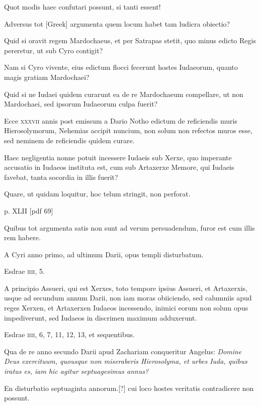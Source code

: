 \begin{parnumbers}
Quot modis haec confutari possunt, si tanti essent!

Adversus tot \textgreek{[Greek]} argumenta quem locum
 habet tam ludicra obiectio?

Quid si oravit regem Mardochaeus, et per Satrapas stetit, quo
minus edicto Regis pereretur, ut sub Cyro contigit?

Nam si Cyro vivente,
eius edictum flocci fecerunt hostes Iudaeorum, quanto magis
gratiam Mardochaei?

Quid si ne Iudaei quidem curarunt ea de re Mardochaeum
compellare, ut non Mardochaei, sed ipsorum Iudaeorum
culpa fuerit?

Ecce \textsc{xxxvii} annis post emissum a Dario Notho edictum
de reficiendis muris Hierosolymorum, Nehemias accipit nuncium,
non solum non refectos muros esse, sed neminem de reficiendis
quidem curare.

Haec negligentia nonne potuit incessere Iudaeis sub
Xerxe, quo imperante accusatio in Iudaeos instituta est, cum sub Artaxerxe
Memore, qui Iudaeis favebat, tanta socordia in illis fuerit?

Quare, ut quidam loquitur, hoc telum stringit, non perforat.

\clearpage
p. XLII [pdf 69]

Quibus tot argumenta satis non sunt ad verum persuadendum, furor est
cum illis rem habere.

A Cyri anno primo, ad ultimum Darii, opus
templi disturbatum.

Esdrae \textsc{iiii}, 5.

A principio Assueri, qui est
Xerxes, toto tempore ipsius Assueri, et Artaxerxis, usque ad secundum
annum Darii, non iam moras obiiciendo, sed calumniis apud
reges Xerxen, et Artaxerxen Iudaeos incessendo, inimici eorum
non solum opus impediverunt, sed Iudaeos in discrimen maximum
adduxerunt.

Esdrae \textsc{iiii}, 6, 7, 11, 12, 13, et sequentibus.

Qua de re
anno secundo Darii apud Zachariam conqueritur Angelus: \textit{Domine
Deus exercituum, quousque non miseraberis Hierosolyma, et
urbes Iuda, quibus iratus es, iam hic agitur septuagesimus annus?}

En disturbatio septuaginta annorum.[?] cui loco hostes veritatis contradicere
non possunt.


\end{parnumbers}
